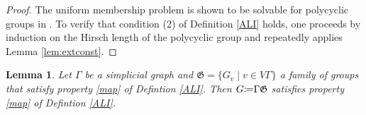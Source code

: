 \documentclass[12pt, a4paper]{amsart}
\newtheorem{Lem}[Thm]{Lemma}
\theoremstyle{remark}
\theoremstyle{definition}
\begin{document}
\begin{proof}
The uniform membership problem is shown to be solvable for polycyclic groups in \cite{BCRS}. To verify that condition (2) of Definition \ref{ALI} holds, one proceeds by induction on the Hirsch length of the polycyclic group and repeatedly applies Lemma \ref{lem:extconst}.
\end{proof}

\begin{Lem}\label{cond2}
Let ${\Gamma}$ be a simplicial graph and  $\mathfrak{G}=\{G_v \mid v\in V{\Gamma}\}$ a family of groups that satisfy property \eqref{map} of Defintion \ref{ALI}. Then $G{\mathrel{\mathop\mathchar"303A}\mkern-1.2mu=} {\Gamma} \mathfrak{G}$ satisfies property \eqref{map} of Defintion \ref{ALI}.  
\end{Lem}
\end{document}
